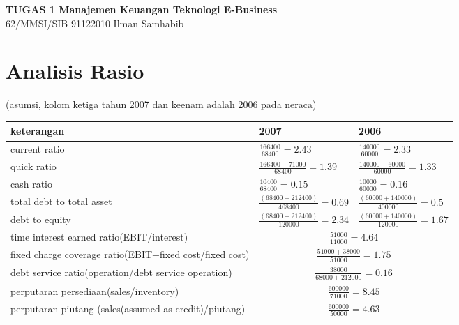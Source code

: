 \documentclass{article}
\begin{document}
\begin{center}
    \textbf{TUGAS 1 Manajemen Keuangan Teknologi E-Business}\\
    62/MMSI/SIB 91122010 Ilman Samhabib
\end{center}
\section*{Analisis Rasio}
(asumsi, kolom ketiga tahun 2007 dan keenam adalah 2006 pada neraca)
\renewcommand{\arraystretch}{1.5}
\begin{center}
    \begin{tabular}{ |p{7cm}|p{3.5cm}|p{3.5cm}|}
        \hline
      keterangan & 2007 & 2006\\ 
      \hline
      current ratio  & $\frac{166400}{68400}=2.43$ &$\frac{140000}{60000}=2.33$ \\ 
      \hline
      quick ratio  & $\frac{166400-71000}{68400}=1.39$ &$\frac{140000-60000}{60000}=1.33$ \\ 
      \hline
      cash ratio  & $\frac{10400}{68400}=0.15$ &$\frac{10000}{60000}=0.16$ \\ 
      \hline
      
      \hline
      total debt to total asset  & $\frac{(68400+212400)}{408400}=0.69$ 
      &$\frac{(60000+140000)}{400000}=0.5$ \\ 
      \hline
      debt to equity  & $\frac{(68400+212400)}{120000}=2.34$ 
      &$\frac{(60000+140000)}{120000}=1.67$ \\ 
      \hline
      time interest earned ratio(EBIT/interest)  & \multicolumn{2}{|c|}{$\frac{51000}{11000}=4.64$} \\ 
      \hline
      fixed charge coverage ratio(EBIT+fixed cost/fixed cost)  & \multicolumn{2}{|c|}{$\frac{51000+38000}{51000}=1.75$} \\ 
      \hline
      debt service ratio(operation/debt service operation)  & \multicolumn{2}{|c|}{$\frac{38000}{68000+212000}=0.16$} \\ 
      \hline
      perputaran persediaan(sales/inventory)  & \multicolumn{2}{|c|}{$\frac{600000}{71000}=8.45$} \\ 
      \hline
      perputaran piutang (sales(assumed as credit)/piutang)  & \multicolumn{2}{|c|}{$\frac{600000}{50000}=4.63$} \\ 
      \hline
      

\end{tabular}
\end{center}
\end{document}
